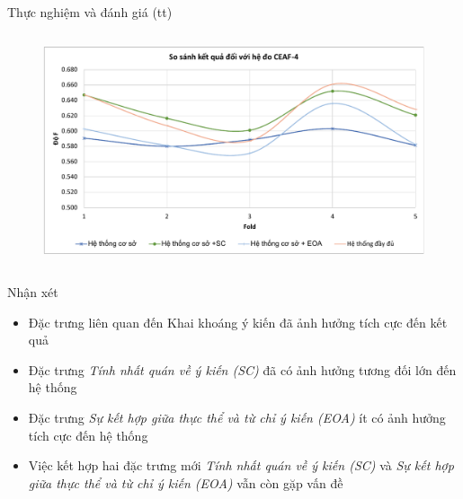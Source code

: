 \documentclass[9pt,xcolor=table]{beamer}
\begin{document}
		\begin{frame}[t]{Thực nghiệm và đánh giá (tt)}								
			\begin{columns}[t]
				\begin{column}{\textwidth}
					\begin{figure}[H] 			
						\centering					
						\includegraphics[scale=0.35]{charts/chart_ceaf4.pdf}										
					\end{figure} 				
				\end{column}
			\end{columns}
			\begin{columns}[t]
				\begin{column}{\textwidth}
					\begin{block}{Nhận xét}
						\footnotesize		
						\begin{itemize}
							\item{Đặc trưng liên quan đến Khai khoáng ý kiến đã ảnh hưởng tích cực đến kết quả}
							\item{Đặc trưng \textit{Tính nhất quán về ý kiến (SC)} đã có ảnh hưởng tương đối lớn đến hệ thống}
							\item{Đặc trưng \textit{Sự kết hợp giữa thực thể và từ chỉ ý kiến (EOA)} ít có ảnh hưởng tích cực đến hệ thống}
							\item{Việc kết hợp hai đặc trưng mới \textit{Tính nhất quán về ý kiến (SC)} và \textit{Sự kết hợp giữa thực thể và từ chỉ ý kiến (EOA)} vẫn còn gặp vấn đề}
						\end{itemize}			
					\end{block}
				\end{column}				
			\end{columns}						
		\end{frame}	
\end{document}
